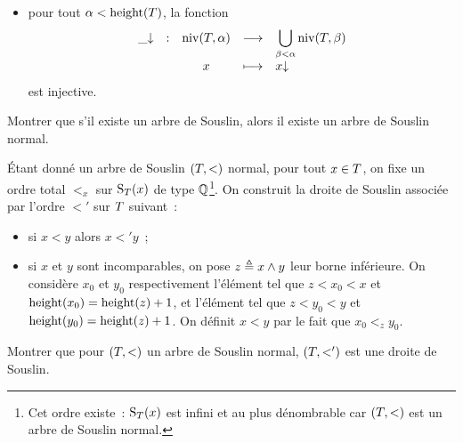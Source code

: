 \begin{problem}
\begin{itemize}
    est infini~;
  \item pour tout $\alpha < \operatorname{height}(T)$, la fonction
    \[\makeFun{\downcl{\tok}}
              {\level(\varTree,\varOa)}
              {\bigcup_{\varOb < \varOa}\level(\varTree,\varOb)}
              {x}{\downcl{x}}\]
    est injective.
  \end{itemize}
  \begin{pbQuest}[resume]
  \item Montrer que s'il existe un arbre de Souslin, alors il existe un arbre
    de Souslin normal.
  \end{pbQuest}
  \'Etant donné un arbre de Souslin $(T,<)$ normal, pour tout
  $x \in T$, on fixe un ordre total $<_x$ sur $\operatorname{S}_{T}(x)$ de type
  $\mathbb Q$\footnote{Cet ordre existe~: $\operatorname{S}_{T}(x)$ est infini et
  au plus dénombrable car $(T,<)$ est un arbre de Souslin normal.}. On
  construit la droite de Souslin associée par l'ordre $<'$ sur $T$
  suivant~:
  \begin{itemize}
  \item si $x < y$ alors $x <' y$~;
  \item si $x$ et $y$ sont incomparables, on pose $z \triangleq x \wedge y$ leur
    borne inférieure. On considère $x_0$ et $y_0$ respectivement l'élément
    tel que $z < x_0 < x$ et $\operatorname{height}(x_0) = \operatorname{height}(z) + 1$, et l'élément tel
    que $z < y_0 < y$ et $\operatorname{height}(y_0) = \operatorname{height}(z) + 1$. On définit
    $x < y$ par le fait que $x_0 <_z y_0$.
  \end{itemize}
  \begin{pbQuest}[resume]
  \item Montrer que pour $(T,<)$ un arbre de Souslin normal,
    $(T,<')$ est une droite de Souslin.
  \end{pbQuest}



\end{problem}
